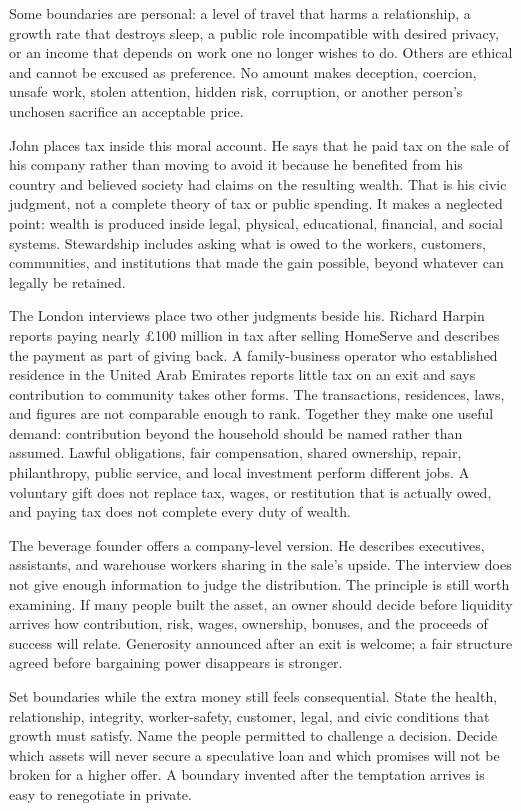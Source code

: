 Some boundaries are personal: a level of travel that harms a relationship, a
growth rate that destroys sleep, a public role incompatible with desired
privacy, or an income that depends on work one no longer wishes to do. Others
are ethical and cannot be excused as preference. No amount makes deception,
coercion, unsafe work, stolen attention, hidden risk, corruption, or another
person's unchosen sacrifice an acceptable price.

John places tax inside this moral account. He says that he paid tax on the
sale of his company rather than moving to avoid it because he benefited from
his country and believed society had claims on the resulting wealth. That is
his civic judgment, not a complete theory of tax or public spending. It makes
a neglected point: wealth is produced inside legal, physical, educational,
financial, and social systems. Stewardship includes asking what is owed to the
workers, customers, communities, and institutions that made the gain
possible, beyond whatever can legally be retained.

The London interviews place two other judgments beside his. Richard Harpin
reports paying nearly \pounds100 million in tax after selling HomeServe and
describes the payment as part of giving back. A family-business operator who
established residence in the United Arab Emirates reports little tax on an
exit and says contribution to community takes other forms. The transactions,
residences, laws, and figures are not comparable enough to rank. Together they
make one useful demand: contribution beyond the household should be named
rather than assumed. Lawful obligations, fair compensation, shared ownership,
repair, philanthropy, public service, and local investment perform different
jobs. A voluntary gift does not replace tax, wages, or restitution that is
actually owed, and paying tax does not complete every duty of wealth.

The beverage founder offers a company-level version. He describes executives,
assistants, and warehouse workers sharing in the sale's upside. The interview
does not give enough information to judge the distribution. The principle is
still worth examining. If many people built the asset, an owner should decide
before liquidity arrives how contribution, risk, wages, ownership, bonuses,
and the proceeds of success will relate. Generosity announced after an exit is
welcome; a fair structure agreed before bargaining power disappears is
stronger.

Set boundaries while the extra money still feels consequential. State the
health, relationship, integrity, worker-safety, customer, legal, and civic
conditions that growth must satisfy. Name the people permitted to challenge a
decision. Decide which assets will never secure a speculative loan and which
promises will not be broken for a higher offer. A boundary invented after the
temptation arrives is easy to renegotiate in private.

